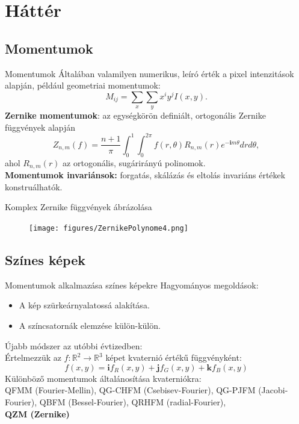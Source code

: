 \documentclass{beamer}
\newcommand{\R}{\mathbb{R}}
\newcommand{\qi}{\textbf{i}}
\newcommand{\qj}{\textbf{j}}
\newcommand{\qk}{\textbf{k}}
\def\R{{\mathbb R}}
\begin{document}
\section{Háttér}
\subsection{Momentumok}
\begin{frame}{Momentumok}
    \vskip 7mm
Általában valamilyen numerikus, leíró érték a pixel intenzitások alapján, 
például geometriai momentumok: $$M_{ij} = \sum_x\sum_y x^i y^j I(x,y).$$
\textbf{Zernike momentumok}: az egységkörön definiált, ortogonális Zernike függvények alapján
$$Z_{n,m}(f) = \frac{n+1}{\pi}\int_0^1\int_0^{2\pi}f(r,\theta)R_{n,m}(r)e^{-\qi m\theta} dr d\theta,$$ ahol $R_{n,m}(r)$ az ortogonális, sugárirányú polinomok.\\

\textbf{Momentumok invariánsok:} forgatás, skálázás és eltolás invariáns értékek konstruálhatók.
\end{frame}

\begin{frame}{Komplex Zernike függvények ábrázolása}
    \vskip 10mm
    \begin{figure}
        \texttt{[image: figures/ZernikePolynome4.png]}
    \end{figure}
\end{frame}

\subsection{Színes képek}
\begin{frame}{Momentumok alkalmazása színes képekre}
Hagyományos megoldások:
\begin{itemize}
    \item A kép szürkeárnyalatossá alakítása.
    \item A színcsatornák elemzése külön-külön.
\end{itemize}
Újabb módszer az utóbbi évtizedben:\\
Értelmezzük az $f : \R^2 \rightarrow \R^3$ képet kvaternió értékű függvényként:
$$f(x,y) = \qi f_R(x,y) + \qj f_G(x,y) + \qk f_B(x,y)$$
Különböző momentumok általánosítása kvaterniókra:\\
QFMM (Fourier-Mellin), QG-CHFM (Csebisev-Fourier), QG-PJFM (Jacobi-Fourier), QBFM (Bessel-Fourier), QRHFM (radial-Fourier), \\
\textbf{QZM (Zernike)}
\end{frame}
\end{document}
